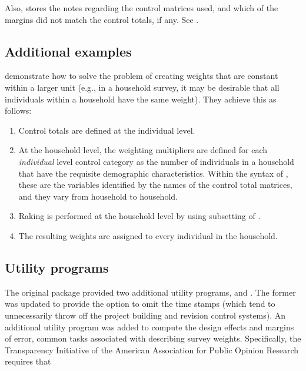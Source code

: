 Also,  stores the notes regarding the control matrices
used, and which of the margins did not match the control totals, if any.
See .

\subsection{Additional examples}


\citet{kolenikov:hammer:2015} demonstrate how to solve the problem of creating
weights that are constant within a larger unit (e.g., in a household survey,
it may be desirable that all individuals within a household have the same weight).
They achieve this as follows:
\begin{enumerate}
    \item Control totals are defined at the individual level.
    \item At the household level, the weighting multipliers are defined
        for each \textit{individual} level control category as the number 
        of individuals in a household that have the requisite demographic characteristics.
        Within the syntax of , these are the variables
        identified by the  names of the control total matrices,
        and they vary from household to household.
    \item Raking is performed at the household level by using  
        subsetting of .
    \item The resulting weights are assigned to every individual in the household.
\end{enumerate}

\subsection{Utility programs}
\label{subsec:utility}

The original package  provided two additional utility programs,
 and . 
The former was updated to provide the  option to omit the time stamps 
(which tend to unnecessarily throw off the project building and revision control systems).
An additional utility program 
was added to compute the design effects and margins of error, common tasks associated
with describing survey weights. Specifically, the Transparency Initiative
of the American Association for Public Opinion Research
\citep{aapor:2014:ti:terms}
requires that


